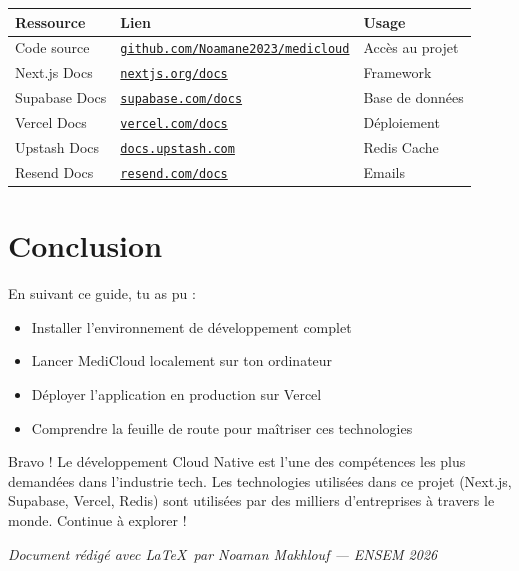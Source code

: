 \documentclass[12pt, a4paper]{article}
\begin{document}
\begin{center}
\begin{tabular}{lll}
  \toprule
  \textbf{Ressource} & \textbf{Lien} & \textbf{Usage} \\
  \midrule
  Code source & \href{https://github.com/Noamane2023/medicloud}{\texttt{github.com/Noamane2023/medicloud}} & Accès au projet \\
  Next.js Docs & \href{https://nextjs.org/docs}{\texttt{nextjs.org/docs}} & Framework \\
  Supabase Docs & \href{https://supabase.com/docs}{\texttt{supabase.com/docs}} & Base de données \\
  Vercel Docs & \href{https://vercel.com/docs}{\texttt{vercel.com/docs}} & Déploiement \\
  Upstash Docs & \href{https://docs.upstash.com}{\texttt{docs.upstash.com}} & Redis Cache \\
  Resend Docs & \href{https://resend.com/docs}{\texttt{resend.com/docs}} & Emails \\
  \bottomrule
\end{tabular}
\end{center}

\section*{Conclusion}

En suivant ce guide, tu as pu :
\begin{itemize}
  \item Installer l'environnement de développement complet
  \item Lancer MediCloud localement sur ton ordinateur
  \item Déployer l'application en production sur Vercel
  \item Comprendre la feuille de route pour maîtriser ces technologies
\end{itemize}

\begin{successbox}{Bravo !}
  Le développement Cloud Native est l'une des compétences les plus demandées
  dans l'industrie tech. Les technologies utilisées dans ce projet (Next.js,
  Supabase, Vercel, Redis) sont utilisées par des milliers d'entreprises
  à travers le monde. Continue à explorer !
\end{successbox}

\vspace{1cm}
\begin{center}
  \textit{Document rédigé avec \LaTeX\ par Noaman Makhlouf — ENSEM 2026}
\end{center}
\end{document}
